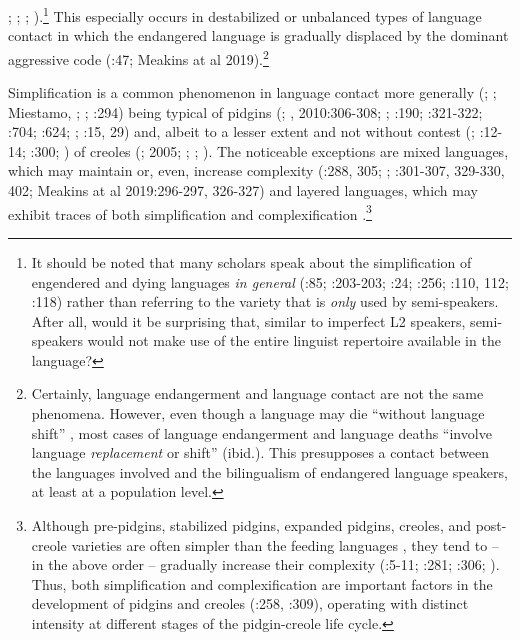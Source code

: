 \documentclass[output=paper]{langscibook}
\begin{document}
\citealt{Swiggers2007}; \citealt{Sallabank2012,20132012}; \citealt{PalosaariCampbell2011}; \citealt{FilipovicPutz2016}).\footnote{It should be noted that many scholars speak about the simplification of engendered and dying languages \textit{in general} (\citealt{Dorian1980}:85; \citealt{Austin1986}:203-203; \citealt{Swiggers2007}:24; \citealt{MesthrieEtAl2009}:256; \citealt{PalosaariCampbell2011}:110, 112; \citealt{Sallabank2023}:118) rather than referring to the variety that is \textit{only} used by semi-speakers. After all, would it be surprising that, similar to imperfect L2 speakers, semi-speakers would not make use of the entire linguist repertoire available in the language?} This especially occurs in destabilized or unbalanced types of language contact in which the endangered language is gradually displaced by the dominant aggressive code (\citealt{Aikhenvald2007}:47; Meakins at al 2019).\footnote{Certainly, language endangerment and language contact are not the same phenomena. However, even though a language may die “without language shift” \citep[201]{Austin1986}, most cases of language endangerment and language deaths “involve language \textit{replacement} or shift” (ibid.). This presupposes a contact between the languages involved and the bilingualism of endangered language speakers, at least at a population level.}

Simplification is a common phenomenon in language contact more generally (\citealt{McWhorter1998,20011998}; \citealt{MatrasSakel2007}; Miestamo, \citealt{SinnemäkiKarlsson2008}; \citealt{Parkvall2008}; \citealt{MeakinsEtAl2019}:294) being typical of pidgins (\citealt{Mühlhäusler1977,19861977}; \citealt{Trudgill1986,19961986}, 2010:306-308; \citealt{Kusters2003}; \citealt{Siegel2008}:190; \citealt{Juvonen2008}:321-322; \citealt{Childs2010}:704; \citealt{Joseph2010}:624; \citealt{ParkvallBakker2013}; \citealt{Velupillai2015}:15, 29) and, albeit to a lesser extent and not without contest (\citealt{DeGraff2003,20052003}; \citealt{AnsaldoMatthews2007}:12-14; \citealt{Hammarström2008}:300; \citealt{BakkerEtAl2011}) of creoles (\citealt{McWhorter1998,20011998}; 2005; \citealt{SeurenWekker2001}; \citealt{Parkvall2008}; \citealt{Velupillai2015}). The noticeable exceptions are mixed languages, which may maintain or, even, increase complexity (\citealt{Matras2009}:288, 305; \citealt{Meakins2013}; \citealt{Velupillai2015}:301-307, 329-330, 402; Meakins at al 2019:296-297, 326-327) and layered languages, which may exhibit traces of both simplification and complexification \citep[42-43]{Aikhenvald2007}.\footnote{Although pre\nobreakdash-pidgins, stabilized pidgins, expanded pidgins, creoles, and post-creole varieties are often simpler than the feeding languages \citep{Velupillai2015}, they tend to – in the above order – gradually increase their complexity (\citealt{Mühlhäusler1986}:5-11; \citealt{Parkvall2008}:281; \citealt{Trudgill2010}:306; \citealt{Velupillai2015}). Thus, both simplification and complexification are important factors in the development of pidgins and creoles (\citealt{HeineKuteva2005}:258, \citealt{Trudgill2010}:309), operating with distinct intensity at different stages of the pidgin-creole life cycle.}
\end{document}
